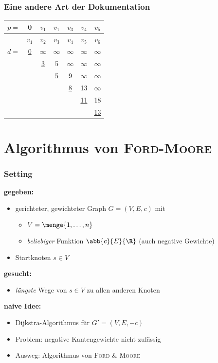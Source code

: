 \documentclass{beamer}
\newcommand{\person}[1]{\textsc{#1}}
\begin{document}
\begin{frame} \frametitle{Eine andere Art der Dokumentation}
	\centering
	\begin{tabular}{r|cccccc}
		\hline
		$p =$ & 0 & $v_1$ & $v_1$ & \cancel{$v_2$} \alert{$v_3$} & \cancel{$v_3$} \alert{$v_4$} & \cancel{$v_4$} \alert{$v_5$} \\ \hline
		& $v_1$ & $v_2$ & $v_3$ & $v_4$ & $v_5$ & $v_6$ \\ \hline
		$d =$ & \uline{0} & $\infty$ & $\infty$ & $\infty$ & $\infty$ & $\infty$ \\
		&  & \uline{3} & 5 & $\infty$ & $\infty$ & $\infty$  \\
		&          &  & \uline{5}  & 9 & $\infty$ & $\infty$  \\
		&          &  &            & \uline{\alert{8}} & 13                 & $\infty$  \\
		&          &   &           &                   & \uline{\alert{11}} & 18  \\
		&          &   &           &                   &                    & \uline{\alert{13}} \\
		\hline
	\end{tabular}
\end{frame}

\section{Algorithmus von \person{Ford}-\person{Moore}}

\begin{frame} \frametitle{Setting \cite{martinovic}}
	\textbf{gegeben:}
	\begin{itemize}
		\item gerichteter, gewichteter Graph $G = (V,E,c)$ mit 
		\begin{itemize}
			\item $V = \menge{1, \dots, n}$
			\item \textit{beliebiger} Funktion $\abb{c}{E}{\R}$ (auch negative Gewichte)
		\end{itemize}
		\item Startknoten $s \in V$
	\end{itemize}

	\textbf{gesucht:}
	\begin{itemize}
		\item \textit{längste} Wege von $s \in V$ zu allen anderen Knoten
	\end{itemize}

	\textbf{naive Idee:}
	\begin{itemize}
		\item Dijkstra-Algorithmus für $G' = (V,E,-c)$
		\item Problem: negative Kantengewichte nicht zulässig
		\item Ausweg: Algorithmus von \person{Ford} \& \person{Moore}
	\end{itemize}
\end{frame}
\end{document}
